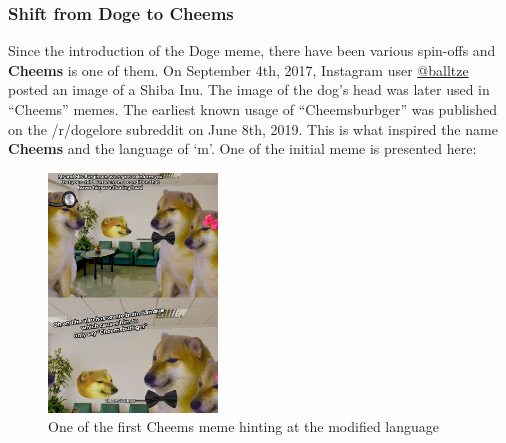 \documentclass{article}
\begin{document}
\subsubsection{Shift from Doge to Cheems}
Since the introduction of the Doge meme, there have been various spin-offs and \textbf{Cheems} is one of them. On September 4th, 2017, Instagram user \href{https://www.instagram.com/balltze}{@balltze} posted an image of a Shiba Inu. The image of the dog's head was later used in ``Cheems'' memes. The earliest known usage of ``Cheemsburbger'' was published on the /r/dogelore subreddit on June 8th, 2019. This is what inspired the name \textbf{Cheems} and the language of `m'. One of the initial meme is presented here:
\begin{figure}[H]
    \centering
    \includegraphics[width=0.4\textwidth]{figures/cheems_1.jpg}
    \caption{One of the first Cheems meme hinting at the modified language}
\end{figure}
\end{document}
